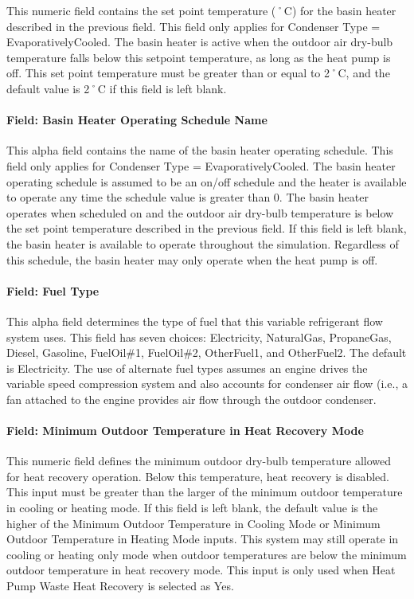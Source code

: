 This numeric field contains the set point temperature (˚C) for the basin heater described in the previous field. This field only applies for Condenser Type = EvaporativelyCooled. The basin heater is active when the outdoor air dry-bulb temperature falls below this setpoint temperature, as long as the heat pump is off. This set point temperature must be greater than or equal to 2˚C, and the default value is 2˚C if this field is left blank.

\paragraph{Field: Basin Heater Operating Schedule Name}\label{field-basin-heater-operating-schedule-name-001}

This alpha field contains the name of the basin heater operating schedule. This field only applies for Condenser Type = EvaporativelyCooled. The basin heater operating schedule is assumed to be an on/off schedule and the heater is available to operate any time the schedule value is greater than 0. The basin heater operates when scheduled on and the outdoor air dry-bulb temperature is below the set point temperature described in the previous field. If this field is left blank, the basin heater is available to operate throughout the simulation. Regardless of this schedule, the basin heater may only operate when the heat pump is off.

\paragraph{Field: Fuel Type}\label{field-fuel-type-001}

This alpha field determines the type of fuel that this variable refrigerant flow system uses. This field has seven choices: Electricity, NaturalGas, PropaneGas, Diesel, Gasoline, FuelOil\#1, FuelOil\#2, OtherFuel1, and OtherFuel2. The default is Electricity. The use of alternate fuel types assumes an engine drives the variable speed compression system and also accounts for condenser air flow (i.e., a fan attached to the engine provides air flow through the outdoor condenser.

\paragraph{Field: Minimum Outdoor Temperature in Heat Recovery Mode}\label{field-minimum-outdoor-temperature-in-heat-recovery-mode}

This numeric field defines the minimum outdoor dry-bulb temperature allowed for heat recovery operation. Below this temperature, heat recovery is disabled. This input must be greater than the larger of the minimum outdoor temperature in cooling or heating mode. If this field is left blank, the default value is the higher of the Minimum Outdoor Temperature in Cooling Mode or Minimum Outdoor Temperature in Heating Mode inputs. This system may still operate in cooling or heating only mode when outdoor temperatures are below the minimum outdoor temperature in heat recovery mode. This input is only used when Heat Pump Waste Heat Recovery is selected as Yes.

